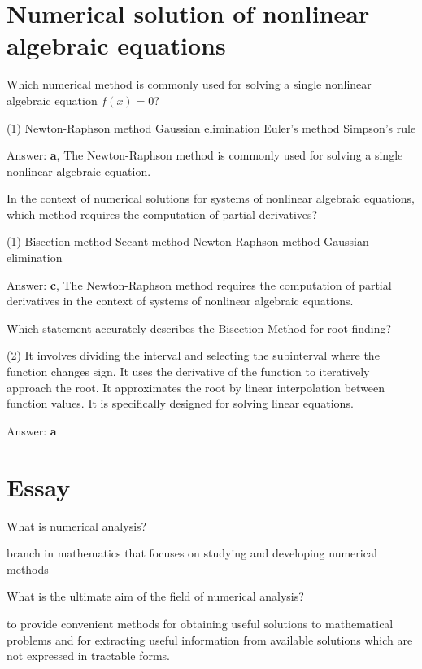 \documentclass{exam}
\begin{document}
\begin{questions}
	\section{Numerical solution of nonlinear algebraic equations}

	\question Which numerical method is commonly used for solving a single nonlinear algebraic equation \(f(x) = 0\)?
	\begin{tasks}(1)
		\task Newton-Raphson method
		\task Gaussian elimination
		\task Euler's method
		\task Simpson's rule
	\end{tasks}
	Answer: \textbf{a}, The Newton-Raphson method is commonly used for solving a single nonlinear algebraic equation.

	\question In the context of numerical solutions for systems of nonlinear algebraic equations, which method requires the computation of partial derivatives?
	\begin{tasks}(1)
		\task Bisection method
		\task Secant method
		\task Newton-Raphson method
		\task Gaussian elimination
	\end{tasks}
	Answer: \textbf{c}, The Newton-Raphson method requires the computation of partial derivatives in the context of systems of nonlinear algebraic equations.

	\question Which statement accurately describes the Bisection Method for root finding?
	\begin{tasks}(2)
		\task It involves dividing the interval and selecting the subinterval where the function changes sign.
		\task It uses the derivative of the function to iteratively approach the root.
		\task It approximates the root by linear interpolation between function values.
		\task It is specifically designed for solving linear equations.
	\end{tasks}
	Answer: \textbf{a}

	\section{Essay}
	\question What is numerical analysis?

	branch in mathematics that focuses on studying and developing numerical methods

	\question What is the ultimate aim of the field of numerical analysis?

	to provide convenient methods for obtaining useful solutions to mathematical problems and for extracting useful information from available solutions which are not expressed in tractable forms.


\end{questions}
\end{document}
